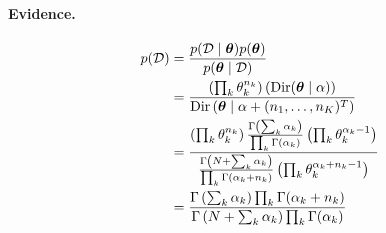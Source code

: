\paragraph{Evidence.}
    \begin{align}
        p(\mathcal D)   &= \frac{p(\mathcal D \mid \boldsymbol{\mathbf{\theta}})p(\boldsymbol{\mathbf{\theta}})}{p(\boldsymbol{\mathbf{\theta}} \mid \mathcal D)} \nonumber\\
                        &= \frac{\left(\prod_k \theta_k^{n_k}\right)\left(\operatorname{Dir}(\boldsymbol{\mathbf{\theta}} \mid \alpha\right))}{\operatorname{Dir}\left(\boldsymbol{\mathbf{\theta}} \mid \alpha + (n_1, \dotsc, n_K)^T\right)} \nonumber\\
                        &= \frac
                            {
                                \left(\prod_k \theta_k^{n_k}\right)
                                \frac
                                    {\Gamma\left(\sum_k \alpha_k\right)}
                                    {\prod_k \Gamma(\alpha_k)}
                                \left(\prod_k \theta_k^{\alpha_k - 1}\right)
                            }
                            {
                                \frac
                                    {\Gamma\left(N + \sum_k \alpha_k\right)}
                                    {\prod_k \Gamma(\alpha_k + n_k)}
                                \left(\prod_k \theta_k^{\alpha_k + n_k - 1}\right)
                            } \nonumber\\
                        &= \frac
                            {
                                \Gamma\left(\sum_k \alpha_k\right)
                                \prod_k \Gamma(\alpha_k + n_k)
                            }
                            {
                                \Gamma\left(N + \sum_k \alpha_k\right)
                                \prod_k \Gamma(\alpha_k)
                            } \label{eqn:bayes/par-est/dir-cat/evidence}
    \end{align}